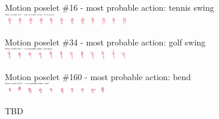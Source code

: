 \begin{figure}[th]
\begin{center}
\scriptsize
 Motion poselet \#16 - most probable action: tennis swing\\
 \includegraphics[trim=0 0 12cm 0.25cm, clip, width=0.49\textwidth]{Fig/poselets4}

 Motion poselet \#34 - most probable action: golf swing\\
 \includegraphics[trim=0 0 12cm 0.25cm,clip, width=0.49\textwidth]{Fig/poselets5}

 Motion poselet \#160 - most probable action: bend\\
 \includegraphics[trim=0 0 12cm 0.25cm, clip, width=0.49\textwidth]{Fig/poselets6}


\end{center}
\caption{TBD}
\label{fig:poselets_skel}
\end{figure}



